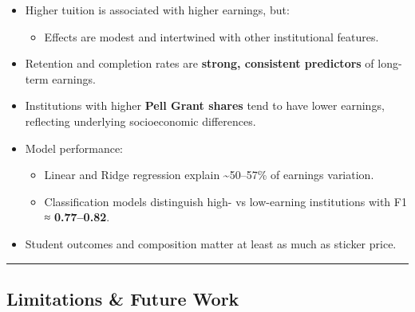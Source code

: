 \documentclass[
  letterpaper,
  DIV=11,
  numbers=noendperiod]{scrartcl}
\providecommand{\tightlist}{%
  \setlength{\itemsep}{0pt}\setlength{\parskip}{0pt}}
\begin{document}
\begin{itemize}
\tightlist
\item
  Higher tuition is associated with higher earnings, but:

  \begin{itemize}
  \tightlist
  \item
    Effects are modest and intertwined with other institutional
    features.
  \end{itemize}
\item
  Retention and completion rates are \textbf{strong, consistent
  predictors} of long-term earnings.
\item
  Institutions with higher \textbf{Pell Grant shares} tend to have lower
  earnings, reflecting underlying socioeconomic differences.
\item
  Model performance:

  \begin{itemize}
  \tightlist
  \item
    Linear and Ridge regression explain \textasciitilde50--57\% of
    earnings variation.
  \item
    Classification models distinguish high- vs low-earning institutions
    with F1 ≈ \textbf{0.77--0.82}.
  \end{itemize}
\item
  Student outcomes and composition matter at least as much as sticker
  price.
\end{itemize}

\begin{center}\rule{0.5\linewidth}{0.5pt}\end{center}

\subsection{Limitations \& Future Work}\label{limitations-future-work}
\end{document}
